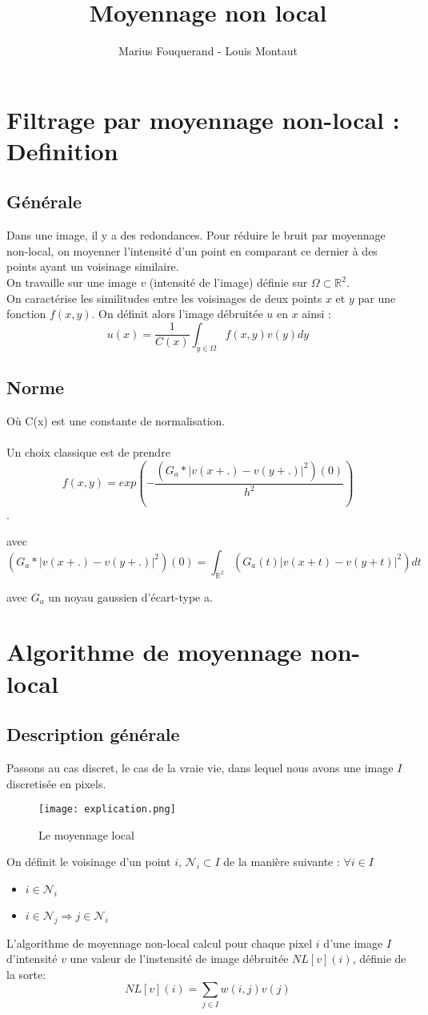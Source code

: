 \documentclass{article}
\title{Moyennage non local}
\author{Marius Fouquerand - Louis Montaut }
\date{}
\begin{document}
\maketitle

\section{Filtrage par moyennage non-local : Definition} 
\subsection{Générale}
Dans une image, il y a des redondances. Pour réduire le bruit par moyennage non-local, on moyenner l'intensité  d'un point en comparant ce dernier à des points ayant un voisinage similaire. \\
On travaille sur une image $v$ (intensité de l'image) définie sur $\Omega \subset \mathbb{R}^2$. \\
On caractérise les similitudes entre les voisinages de deux points $x$ et $y$ par une fonction $f(x,y)$. On définit alors l'image débruitée $u$ en $x$ ainsi : $$u(x) = \frac{1}{C(x)} \int_{y \in \Omega}f(x,y) v(y) dy  $$ 
\subsection{Norme}
Où C(x) est une constante de normalisation.\\
\\
Un choix classique est de prendre $$f(x,y) = exp(- \frac{(G_a * |v(x+.)-v(y + .)|^2)(0)}{h^2}) $$. 

avec $$ (G_a * |v(x+.)-v(y + .)|^2)(0) = \int_{\mathbb{R}^2} (G_a(t) |v(x+t)-v(y+t)|^2) dt  $$ 

avec $G_a$ un noyau gaussien d'écart-type a. 
\section{Algorithme de moyennage non-local}
\subsection{Description générale}
Passons au cas discret, le cas de la vraie vie, dans lequel nous avons une image $I$ discretisée en pixels.\\
\begin{figure}[h!]
    \centering
    \texttt{[image: explication.png]}
    \caption{Le moyennage local}
\end{figure}
\newpage
On définit le voisinage d'un point $i$, $\mathcal{N}_i \subset I$ de la manière suivante : $\forall i \in I  $
\begin{itemize}
    \item $i \in \mathcal{N}_i$
    \item $i \in \mathcal{N}_j\Rightarrow j \in \mathcal{N}_i$
\end{itemize}
L'algorithme de moyennage non-local calcul pour chaque pixel $i$ d'une image $I$ d'intensité $v$ une valeur de l'instensité de image débruitée $NL[v](i)$, définie de la sorte:
$$NL[v](i) = \sum_{j \in I} w(i,j)v(j)$$
\end{document}
